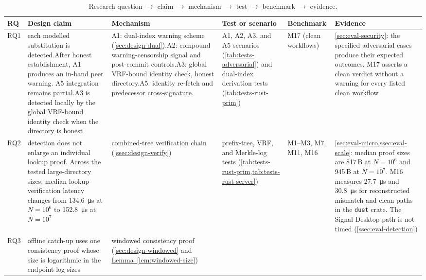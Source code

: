 \begin{landscape}
\begin{table}[htbp]
\centering
\caption[Research-question traceability.]{Research question $\to$ claim $\to$ mechanism $\to$ test $\to$ benchmark $\to$ evidence.}
\label{tab:trace-rq}
\setlength{\extrarowheight}{0pt}
\renewcommand{\arraystretch}{0.9}
\footnotesize
\begin{tabular}{@{}L{1.6cm}L{4.3cm}L{3.7cm}L{5.4cm}L{1.7cm}L{5.4cm}@{}}
\toprule
RQ & Design claim & Mechanism & Test or scenario & Benchmark & Evidence \\
\midrule
RQ1 & each modelled substitution is detected.\newline After honest establishment, A1 produces an
in-band peer warning. A5 integration remains partial.\newline A3 is detected locally by the global
VRF-bound identity check when the directory is honest &
A1: dual-index warning scheme (\cref{sec:design-dual}).\newline A2: compound warning-censorship
signal and post-commit controls.\newline A3: global VRF-bound identity check, honest
directory.\newline A5: identity re-fetch and predecessor cross-signature. &
A1, A2, A3, and A5 scenarios (\cref{tab:tests-adversarial}) and dual-index derivation tests
(\cref{tab:tests-rust-prim}) &
M17 (clean workflows) & \cref{sec:eval-security}: the specified adversarial cases produce their expected outcomes.
M17 asserts a clean verdict without a warning for every listed clean workflow \\
RQ2 & detection does not enlarge an individual lookup proof. Across the tested large-directory
sizes, median lookup-verification latency changes from \SI{134.6}{\micro\second} at $N=10^6$ to
\SI{152.8}{\micro\second} at $N=10^7$ &
combined-tree verification chain (\cref{ssec:design-verify}) &
prefix-tree, VRF, and Merkle-log tests (\cref{tab:tests-rust-prim,tab:tests-rust-server}) &
M1--M3, M7, M11, M16 & \cref{sec:eval-micro,ssec:eval-scale}: median proof sizes are
\num{817}\,B at $N=10^6$ and \num{945}\,B at $N=10^7$. M16 measures
\SI{27.7}{\micro\second} and \SI{30.8}{\micro\second} for reconstructed mismatch and clean
paths in the \texttt{duet} crate. The Signal Desktop path is not timed
(\cref{ssec:eval-detection}) \\
RQ3 & offline catch-up uses one consistency proof whose size is logarithmic in the endpoint log
sizes &
windowed consistency proof (\cref{sec:design-windowed} and \hyperref[lem:windowed-size]{Lemma~\ref*{lem:windowed-size}}) &

\end{tabular}
\end{table}
\end{landscape}
